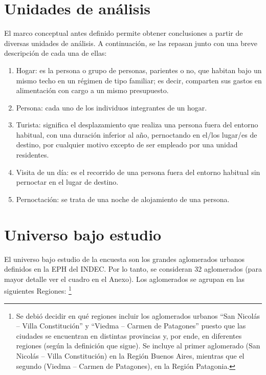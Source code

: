 \documentclass[
  openany]{book}
\begin{document}
\hypertarget{unidades-de-anuxe1lisis}{%
\section{Unidades de análisis}\label{unidades-de-anuxe1lisis}}

El marco conceptual antes definido permite obtener conclusiones a partir de diversas unidades de análisis. A continuación, se las repasan junto con una breve descripción de cada una de ellas:

\begin{enumerate}
\def\labelenumi{\arabic{enumi}.}
\item
  Hogar: es la persona o grupo de personas, parientes o no, que habitan bajo un mismo techo en un régimen de tipo familiar; es decir, comparten sus gastos en alimentación con cargo a un mismo presupuesto.
\item
  Persona: cada uno de los individuos integrantes de un hogar.
\item
  Turista: significa el desplazamiento que realiza una persona fuera del entorno habitual, con una duración inferior al año, pernoctando en el/los lugar/es de destino, por cualquier motivo excepto de ser empleado por una unidad residentes.
\item
  Visita de un día: es el recorrido de una persona fuera del entorno habitual sin pernoctar en el lugar de destino.
\item
  Pernoctación: se trata de una noche de alojamiento de una persona.
\end{enumerate}

\hypertarget{universo-bajo-estudio}{%
\section{Universo bajo estudio}\label{universo-bajo-estudio}}

El universo bajo estudio de la encuesta son los grandes aglomerados urbanos definidos en la EPH del INDEC. Por lo tanto, se consideran 32 aglomerados (para mayor detalle ver el cuadro en el Anexo). Los aglomerados se agrupan en las siguientes Regiones: \footnote{Se debió decidir en qué regiones incluir los aglomerados urbanos ``San Nicolás -- Villa Constitución'' y ``Viedma -- Carmen de Patagones'' puesto que las ciudades se encuentran en distintas provincias y, por ende, en diferentes regiones (según la definición que sigue). Se incluye al primer aglomerado (San Nicolás -- Villa Constitución) en la Región Buenos Aires, mientras que el segundo (Viedma -- Carmen de Patagones), en la Región Patagonia.}
\end{document}
